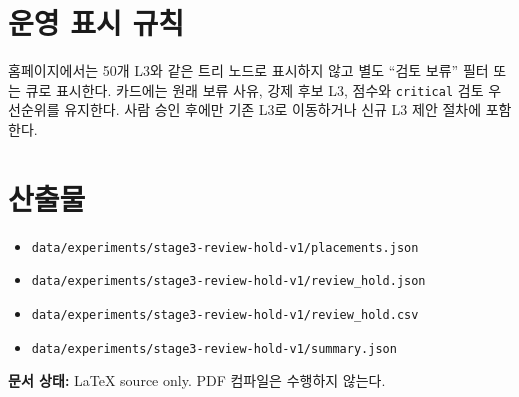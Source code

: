 \documentclass[11pt,a4paper]{article}
\newcommand{\code}[1]{\texttt{#1}}
\begin{document}
\section{운영 표시 규칙}

홈페이지에서는 50개 L3와 같은 트리 노드로 표시하지 않고 별도 ``검토 보류''
필터 또는 큐로 표시한다. 카드에는 원래 보류 사유, 강제 후보 L3, 점수와
\code{critical} 검토 우선순위를 유지한다. 사람 승인 후에만 기존 L3로 이동하거나
신규 L3 제안 절차에 포함한다.

\section*{산출물}
\begin{itemize}
  \item \nolinkurl{data/experiments/stage3-review-hold-v1/placements.json}
  \item \nolinkurl{data/experiments/stage3-review-hold-v1/review_hold.json}
  \item \nolinkurl{data/experiments/stage3-review-hold-v1/review_hold.csv}
  \item \nolinkurl{data/experiments/stage3-review-hold-v1/summary.json}
\end{itemize}

\vfill
\noindent\textbf{문서 상태:} LaTeX source only. PDF 컴파일은 수행하지 않는다.
\end{document}
